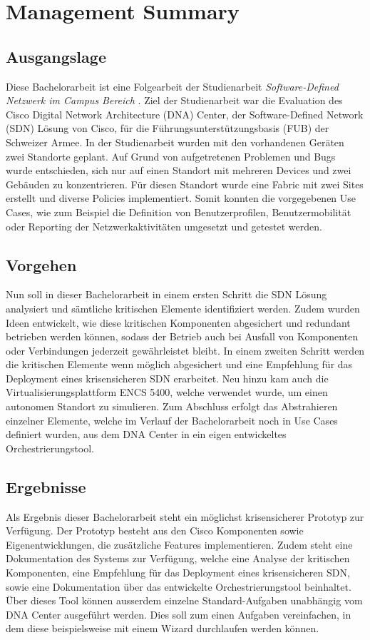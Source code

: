 \section{Management Summary}

\subsection{Ausgangslage}
Diese Bachelorarbeit ist eine Folgearbeit der Studienarbeit \textit{Software-Defined Netzwerk im Campus Bereich} \cite{studienarbeit}. Ziel der Studienarbeit war die Evaluation des Cisco Digital Network Architecture (DNA) Center, der Software-Defined Network (SDN) Lösung von Cisco, für die Führungsunterstützungsbasis (FUB) der Schweizer Armee. In der Studienarbeit wurden mit den vorhandenen Geräten zwei Standorte geplant. Auf Grund von aufgetretenen Problemen und Bugs wurde entschieden, sich nur auf einen Standort mit mehreren Devices und zwei Gebäuden zu konzentrieren. Für diesen Standort wurde eine Fabric mit zwei Sites erstellt und diverse Policies implementiert. Somit konnten die vorgegebenen Use Cases, wie zum Beispiel die Definition von Benutzerprofilen, Benutzermobilität oder Reporting der Netzwerkaktivitäten umgesetzt und getestet werden.

\subsection{Vorgehen}
Nun soll in dieser Bachelorarbeit in einem ersten Schritt die SDN Lösung analysiert und sämtliche kritischen Elemente identifiziert werden. Zudem wurden Ideen entwickelt, wie diese kritischen Komponenten abgesichert und redundant betrieben werden können, sodass der Betrieb auch bei Ausfall von Komponenten oder Verbindungen jederzeit ge\-währ\-leis\-tet bleibt. In einem zweiten Schritt werden die kritischen Elemente wenn möglich abgesichert und eine Empfehlung für das Deployment eines krisensicheren SDN erarbeitet. Neu hinzu kam auch die Virtualisierungsplattform ENCS 5400, welche verwendet wurde, um einen autonomen Standort zu simulieren. Zum Abschluss erfolgt das Abstrahieren einzelner Elemente, welche im Verlauf der Bachelorarbeit noch in Use Cases definiert wurden, aus dem DNA Center in ein eigen entwickeltes Orchestrierungstool. 

\subsection{Ergebnisse}
Als Ergebnis dieser Bachelorarbeit steht ein möglichst krisensicherer Prototyp zur Ver\-fü\-gung. Der Prototyp besteht aus den Cisco Komponenten sowie Eigenentwicklungen, die zu\-sätz\-liche Features implementieren. Zudem steht eine Dokumentation des Systems zur Verfügung, welche eine Analyse der kritischen Komponenten, eine Empfehlung für das Deployment eines krisensicheren SDN, sowie eine Dokumentation über das entwickelte Orchestrierungstool beinhaltet. Über dieses Tool können ausserdem einzelne Standard-Aufgaben unabhängig vom DNA Center ausgeführt werden. Dies soll zum einen Aufgaben vereinfachen, in dem diese beispielsweise mit einem Wizard durchlaufen werden können. 
 
